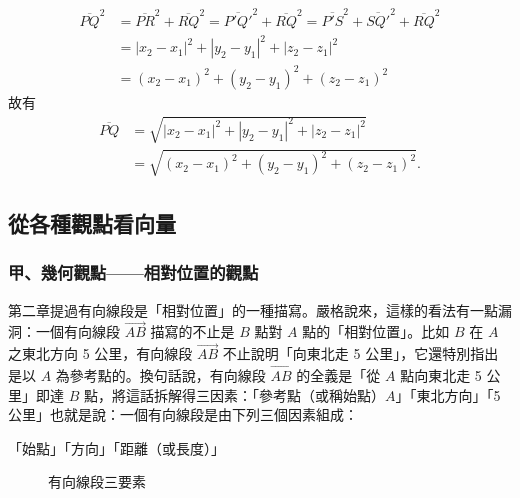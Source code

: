\begin{align*}
\overline{PQ}^2 &= \overline{PR}^2 + \overline{RQ}^2 = \overline{P'Q'}^2 + \overline{RQ}^2 = \overline{P'S}^2 + \overline{SQ'}^2 + \overline{RQ}^2 \\
&= |x_2 - x_1|^2 + |y_2 - y_1|^2 + |z_2 - z_1|^2 \\
&= (x_2 - x_1)^2 + (y_2 - y_1)^2 + (z_2 - z_1)^2
\end{align*}
故有
\begin{align*}
\overline{PQ} &= \sqrt{|x_2 - x_1|^2 + |y_2 - y_1|^2 + |z_2 - z_1|^2} \\
&= \sqrt{(x_2 - x_1)^2 + (y_2 - y_1)^2 + (z_2 - z_1)^2}.
\end{align*}

\subsection{從各種觀點看向量}
\label{sec:b3s-3-2}

\subsubsection*{甲、幾何觀點——相對位置的觀點}

第二章提過有向線段是「相對位置」的一種描寫。嚴格說來，這樣的看法有一點漏洞：一個有向線段 $\vec{AB}$ 描寫的不止是 $B$ 點對 $A$ 點的「相對位置」。比如 $B$ 在 $A$ 之東北方向 5 公里，有向線段 $\vec{AB}$ 不止說明「向東北走 5 公里」，它還特別指出是以 $A$ 為參考點的。換句話說，有向線段 $\vec{AB}$ 的全義是「從 $A$ 點向東北走 5 公里」即達 $B$ 點，將這話拆解得三因素：「參考點（或稱始點）$A$」「東北方向」「5 公里」也就是說：一個有向線段是由下列三個因素組成：
\begin{center}
「始點」「方向」「距離（或長度）」
\end{center}

\begin{figure}[H]
\centering
{}
\caption{有向線段三要素}
\label{fig:b3s-fig3-5}
\end{figure}

